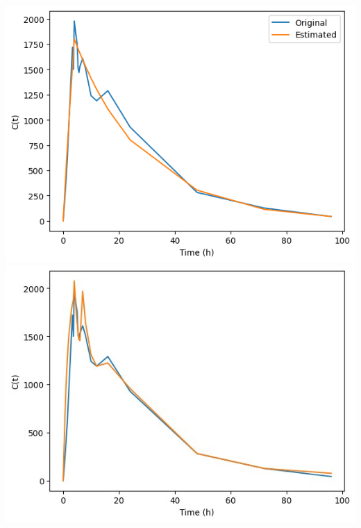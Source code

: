 \documentclass[oneside,senior,etd]{BYUPhys}
\begin{document}
\begin{minipage}{0.45\linewidth}
	\includegraphics[width=2.0\linewidth]{results/basic_1.png}\newline
	\includegraphics[width=2.0\linewidth]{results/1.jpg}\newline
\end{minipage}
\end{document}
